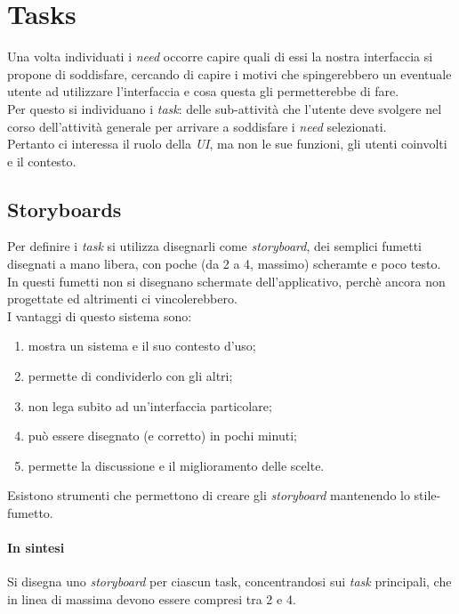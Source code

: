 \section{Tasks}
Una volta individuati i \textit{need} occorre capire quali di essi la nostra interfaccia si propone di soddisfare, cercando di capire i motivi che spingerebbero un eventuale utente ad utilizzare l'interfaccia e cosa questa gli permetterebbe di fare. \\
Per questo si individuano i \textit{task}: delle sub-attivit\`a che l'utente deve svolgere nel corso dell'attivit\`a generale per arrivare a soddisfare i \textit{need} selezionati. \\
Pertanto ci interessa il ruolo della \textit{UI}, ma non le sue funzioni, gli utenti coinvolti e il contesto.

\subsection{Storyboards}
Per definire i \textit{task} si utilizza disegnarli come \textit{storyboard}, dei semplici fumetti disegnati a mano libera, con poche (da 2 a 4, massimo) scheramte e poco testo. \\
In questi fumetti non si disegnano schermate dell'applicativo, perch\`e ancora non progettate ed altrimenti ci vincolerebbero. \\
I vantaggi di questo sistema sono:
\begin{enumerate}
	\item mostra un sistema e il suo contesto d'uso;
	\item permette di condividerlo con gli altri;
	\item non lega subito ad un'interfaccia particolare;
	\item pu\`o essere disegnato (e corretto) in pochi minuti;
	\item permette la discussione e il miglioramento delle scelte.
\end{enumerate}
Esistono strumenti che permettono di creare gli \textit{storyboard} mantenendo lo stile-fumetto.
\paragraph{In sintesi}
Si disegna uno \textit{storyboard} per ciascun task, concentrandosi sui \textit{task} principali, che in linea di massima devono essere compresi tra 2 e 4.